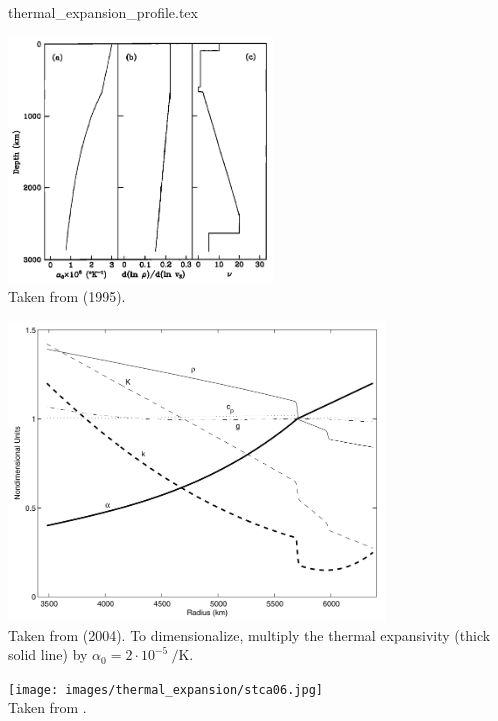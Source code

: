 \begin{flushright} {\tiny {\color{gray} thermal\_expansion\_profile.tex}} \end{flushright}


\begin{center}
\includegraphics[width=7cm]{images/thermal_expansion/pape95}\\
{\captionfont 
Taken from \textcite{pape95} (1995).}
\end{center}

\begin{center}
\includegraphics[width=10cm]{images/thermal_expansion/buja04}\\
{\captionfont 
Taken from \textcite{buja04} (2004). To dimensionalize, multiply 
the thermal expansivity (thick solid line) 
by $\alpha_0=2\cdot 10^{-5}~\si{\per\kelvin}$.
}
\end{center}


\begin{center}
\texttt{[image: images/thermal\_expansion/stca06.jpg]}\\
{\captionfont Taken from \textcite{stca06}.}
\end{center}

